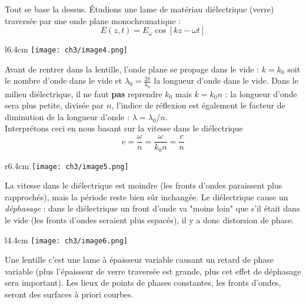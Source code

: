 Tout se base la dessus. Étudions une lame de matériau diélectrique (verre) traversée par une onde 
plane monochromatique :
\begin{equation}
E(z,t) = E_\omega \cos[kz-\omega t]
\end{equation}
\newpage
\begin{wrapfigure}[8]{l}{6.4cm}
	\texttt{[image: ch3/image4.png]}
	\end{wrapfigure}
Avant de rentrer dans la lentille, l'onde plane se propage dans le vide : $k= k_0$ soit le 
nombre d'onde dans le vide et $\lambda_0 = \frac{2\pi}{k_0}$ la longueur d'onde dans le vide. Dans 
le milieu diélectrique, il ne faut \textbf{pas} reprendre $k_0$ mais $k = k_0n$ : la longueur 
d'onde sera plus petite, divisée par $n$, l'indice de réflexion est également le facteur de diminution 
de la longueur d'onde : $\lambda = \lambda_0/n$. \\

Interprétons ceci en nous basant sur la vitesse dans le diélectrique 
\begin{equation}
v = \frac{\omega}{n} = \frac{\omega}{k_0n} = \frac{c}{n}
\end{equation}

\begin{wrapfigure}[8]{r}{6.4cm}
	\vspace{-10mm}
	\texttt{[image: ch3/image5.png]}
	\end{wrapfigure}
La vitesse dans le diélectrique est moindre (les fronts d'ondes paraissent plus rapprochés), mais la 
période reste bien sûr inchangée. Le 
diélectrique cause un \textit{déphasage} : dans le diélectrique un front d'onde va "moins loin" que 
s'il était dans le vide (les fronts d'ondes seraient plus espacés), il y a donc distorsion de phase.\\


\begin{wrapfigure}[6]{l}{4.4cm}
	\vspace{-5mm}
	\texttt{[image: ch3/image6.png]}
	\end{wrapfigure}
Une lentille c'est une lame à épaisseur variable causant un retard de phase variable (plus l'épaisseur 
de verre traversée est grande, plus cet effet de déphasage sera important). Les lieux de points de phases 
constantes, les fronts d'ondes, seront des surfaces à priori courbes.\\

